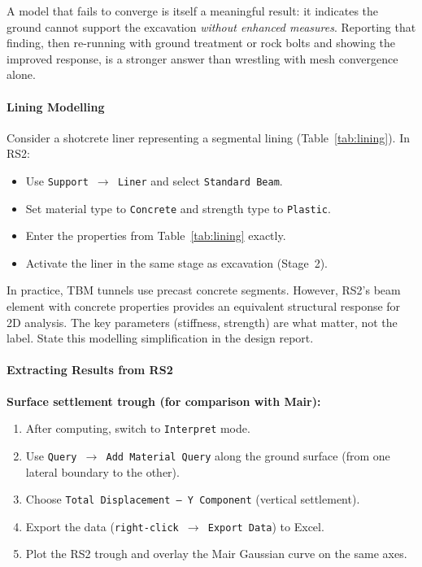 \begin{warnbox}
A model that fails to converge is itself a meaningful result: it indicates the ground cannot support the excavation \emph{without enhanced measures}. Reporting that finding, then re-running with ground treatment or rock bolts and showing the improved response, is a stronger answer than wrestling with mesh convergence alone.
\end{warnbox}

\paragraph{Lining Modelling}
Consider a shotcrete liner representing a segmental lining (Table~\ref{tab:lining}). In RS2:
\begin{itemize}
 \item Use \texttt{Support $\to$ Liner} and select \texttt{Standard Beam}.
 \item Set material type to \texttt{Concrete} and strength type to \texttt{Plastic}.
 \item Enter the properties from Table~\ref{tab:lining} exactly.
 \item Activate the liner in the same stage as excavation (Stage~2).
\end{itemize}

\begin{notebox}
In practice, TBM tunnels use precast concrete segments. However, RS2's beam element with concrete properties provides an equivalent structural response for 2D analysis. The key parameters (stiffness, strength) are what matter, not the label. State this modelling simplification in the design report.
\end{notebox}

\paragraph{Extracting Results from RS2}
\textbf{Surface settlement trough (for comparison with Mair):}
\begin{enumerate}
 \item After computing, switch to \texttt{Interpret} mode.
 \item Use \texttt{Query $\to$ Add Material Query} along the ground surface (from one lateral boundary to the other).
 \item Choose \texttt{Total Displacement -- Y Component} (vertical settlement).
 \item Export the data (\texttt{right-click $\to$ Export Data}) to Excel.
 \item Plot the RS2 trough and overlay the Mair Gaussian curve on the same axes.
\end{enumerate}

